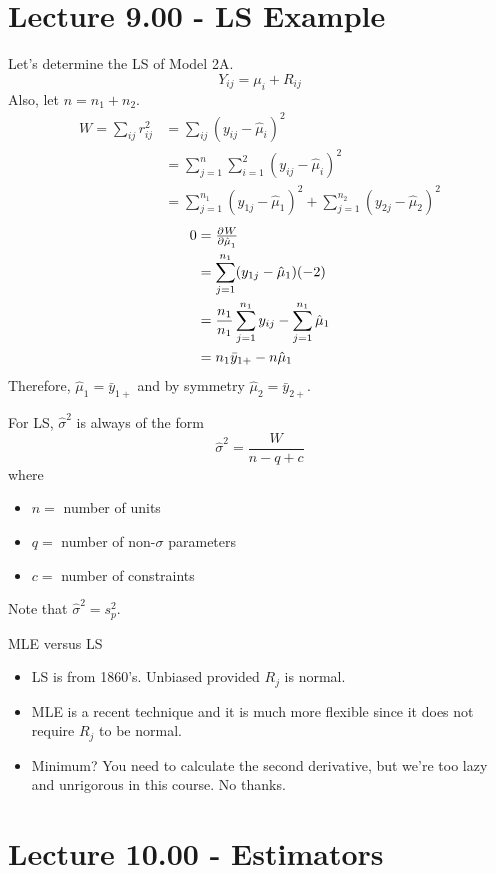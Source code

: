 \section{Lecture 9.00 - LS Example}
Let's determine the LS of Model 2A.
\[ Y_{ij}=\mu_i+R_{ij} \]
Also, let $ n=n_1+n_2 $.
\begin{align*}
    W=\sum_{ij}r_{ij}^2
     & =\sum_{ij}(y_{ij}-\hat{\mu}_i)^2                                                  \\
     & =\sum_{j=1}^{n} \sum_{i=1}^{2} (y_{ij}-\hat{\mu}_i)^2                             \\
     & =\sum_{j=1}^{n_1}(y_{1j}-\hat{\mu}_1)^2 + \sum_{j=1}^{n_2} (y_{2j}-\hat{\mu}_2)^2
\end{align*}
\begin{align*}
    0 & =\pd{W}{\hat{\mu}_1}                                                 \\
      & =\sum_{j=1}^{n_1} (y_{1j}-\hat{\mu}_1)(-2)                           \\
      & =\frac{n_1}{n_1} \sum_{j=1}^{n_1} y_{ij}-\sum_{j=1}^{n_1}\hat{\mu}_1 \\
      & =n_1\bar{y}_{1+}-n\hat{\mu}_1                                        \\
\end{align*}
Therefore, $ \hat{\mu}_1=\bar{y}_{1+} $ and by symmetry $ \hat{\mu}_2=\bar{y}_{2+} $.
\begin{Remark}{}{}
    For LS, $ \hat{\sigma}^2 $ is always of the form
    \[ \hat{\sigma}^2=\frac{W}{n-q+c} \]
    where
    \begin{itemize}
        \item $ n= $ number of units
        \item $ q= $ number of non-$ \sigma $ parameters
        \item $ c= $ number of constraints
    \end{itemize}
    Note that $ \hat{\sigma}^2=s_p^2 $.
\end{Remark}
\begin{Remark}{MLE versus LS}{}
    \begin{itemize}
        \item LS is from 1860's. Unbiased provided $ R_j $ is normal.
        \item MLE is a recent technique and it is much more flexible
              since it does not require $ R_j $ to be normal.
        \item Minimum? You need to calculate the second derivative,
              but we're too lazy and unrigorous in this course. No thanks.
    \end{itemize}
\end{Remark}

\section{Lecture 10.00 - Estimators}
